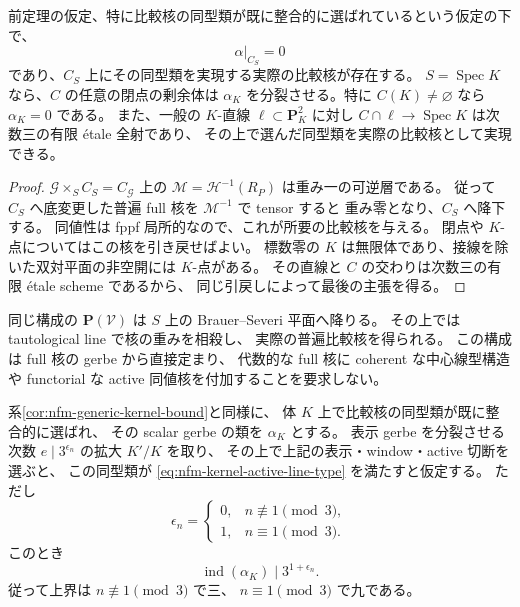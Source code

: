 \begin{corollary}
\label{cor:nfm-kernel-active-curve-splitting}
前定理の仮定、特に比較核の同型類が既に整合的に選ばれているという仮定の下で、
\[
 \alpha|_{C_S}=0
\]
であり、$C_S$ 上にその同型類を実現する実際の比較核が存在する。
$S=\operatorname{Spec}K$ なら、$C$ の任意の閉点の剰余体は
$\alpha_K$ を分裂させる。特に $C(K)\ne\varnothing$ なら $\alpha_K=0$ である。
また、一般の $K$-直線 $\ell\subset\mathbf P^2_K$ に対し
$C\cap\ell\to\operatorname{Spec}K$ は次数三の有限 étale 全射であり、
その上で選んだ同型類を実際の比較核として実現できる。
\end{corollary}

\begin{proof}
$\mathcal G\times_S C_S=C_{\mathcal G}$ 上の
$\mathcal M=\mathcal H^{-1}(R_P)$ は重み一の可逆層である。
従って $C_S$ へ底変更した普遍 full 核を $\mathcal M^{-1}$ で tensor すると
重み零となり、$C_S$ へ降下する。
同値性は fppf 局所的なので、これが所要の比較核を与える。
閉点や $K$-点についてはこの核を引き戻せばよい。
標数零の $K$ は無限体であり、接線を除いた双対平面の非空開には $K$-点がある。
その直線と $C$ の交わりは次数三の有限 étale scheme であるから、
同じ引戻しによって最後の主張を得る。
\end{proof}

同じ構成の $\mathbf P(\mathcal V)$ は $S$ 上の Brauer--Severi 平面へ降りる。
その上では tautological line で核の重みを相殺し、
実際の普遍比較核を得られる。
この構成は full 核の gerbe から直接定まり、
代数的な full 核に coherent な中心線型構造や
functorial な active 同値核を付加することを要求しない。

\begin{corollary}[非分裂表示での次元によらない上界]
\label{cor:nfm-kernel-active-line-unsplit}
系\ref{cor:nfm-generic-kernel-bound}と同様に、
体 $K$ 上で比較核の同型類が既に整合的に選ばれ、
その scalar gerbe の類を $\alpha_K$ とする。
表示 gerbe を分裂させる次数
$e\mid3^{\epsilon_n}$ の拡大 $K'/K$ を取り、
その上で上記の表示・window・active 切断を選ぶと、
この同型類が \eqref{eq:nfm-kernel-active-line-type} を満たすと仮定する。
ただし
\[
 \epsilon_n=
 \begin{cases}
 0,&n\not\equiv1\pmod3,\\
 1,&n\equiv1\pmod3.
 \end{cases}
\]
このとき
\[
 \operatorname{ind}(\alpha_K)\mid3^{1+\epsilon_n}.
\]
従って上界は $n\not\equiv1\pmod3$ で三、
$n\equiv1\pmod3$ で九である。
\end{corollary}

